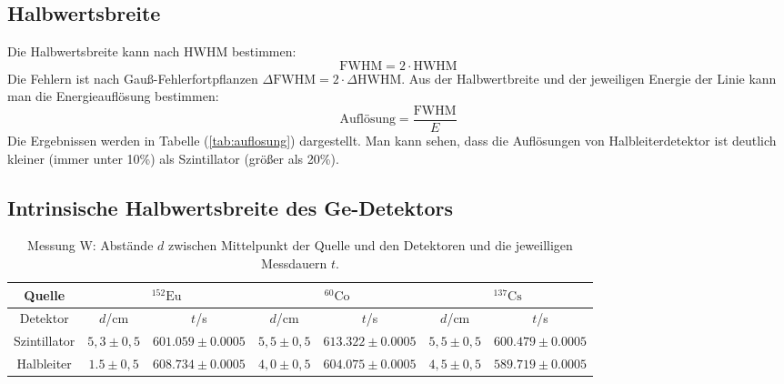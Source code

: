 \documentclass[ngerman,11pt]{article}
\begin{document}
\begin{multicols}{2}
	\subsection{Halbwertsbreite}
	Die Halbwertsbreite kann nach HWHM bestimmen:
	$$ \mathrm{FWHM} = 2\cdot\mathrm{HWHM} $$
	Die Fehlern ist nach Gau\ss-Fehlerfortpflanzen $\Delta\mathrm{FWHM} = 2\cdot\Delta\mathrm{HWHM}$. Aus der Halbwertbreite und der jeweiligen Energie der Linie kann man die Energieaufl\"osung bestimmen:
	$$ \text{Aufl\"osung}=\frac{\mathrm{FWHM}}{E} $$ Die Ergebnissen werden in Tabelle (\ref{tab:auflosung}) dargestellt. Man kann sehen, dass die Aufl\"osungen von Halbleiterdetektor ist deutlich kleiner (immer unter 10\%) als Szintillator (gr\"o\ss er als 20\%).
	\subsection{Intrinsische Halbwertsbreite des Ge-Detektors}
	






























	\end{multicols}
\begin{table}
	\centering
	\begin{tabular}{|c|c|c|c|c|c|c|}
		\hline
		Quelle & \multicolumn{2}{|c|}{$^{152}\mathrm{Eu}$}&\multicolumn{2}{|c|}{$^{60}\mathrm{Co}$}&\multicolumn{2}{|c|}{$^{137}\mathrm{Cs}$}\\ \hline
		Detektor& $d$/cm & $t$/s& $d$/cm & $t$/s& $d$/cm & $t$/s\\ \hline
		Szintillator & $5,3\pm0,5$ & $601.059 \pm0.0005$ & $5,5\pm 0,5$ & $613.322\pm0.0005$ & $5,5\pm0,5$ & $600.479 \pm0.0005$\\ \hline
		Halbleiter & $1.5\pm0,5$ & $608.734\pm 0.0005$ & $4,0\pm 0,5$ & $604.075\pm 0.0005$ & $4,5\pm0,5$ &$589.719 \pm 0.0005$ \\ \hline
	\end{tabular}
	\caption{Messung W: Abst\"ande $d$ zwischen Mittelpunkt der Quelle und den Detektoren und die  jeweilligen Messdauern $t$.}
\end{table}
\end{document}
